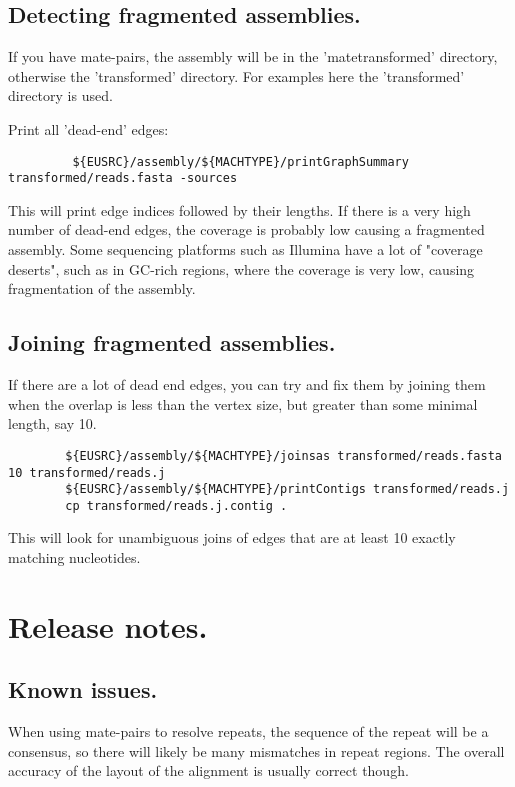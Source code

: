 \documentclass{article}[12pt]
\begin{document}
   \subsection{Detecting fragmented assemblies.}

		If you have mate-pairs, the assembly will be in the
		'matetransformed' directory, otherwise the 'transformed'
		directory.  For examples here the 'transformed' directory is used.
		
		Print all 'dead-end' edges:
\begin{verbatim}
		 ${EUSRC}/assembly/${MACHTYPE}/printGraphSummary transformed/reads.fasta -sources
\end{verbatim}

		This will print edge indices followed by their lengths. If there
		is a very high number of dead-end edges, the coverage is probably
		low causing a fragmented assembly.  Some sequencing platforms such
		as Illumina have a lot of "coverage deserts", such as in GC-rich
		regions, where the coverage is very low, causing fragmentation of
		the assembly.


   \subsection{ Joining fragmented assemblies.}

		If there are a lot of dead end edges, you can try and fix them by
		joining them when the overlap is less than the vertex size, but
		greater than some minimal length, say 10.

\begin{verbatim}
		${EUSRC}/assembly/${MACHTYPE}/joinsas transformed/reads.fasta 10 transformed/reads.j
		${EUSRC}/assembly/${MACHTYPE}/printContigs transformed/reads.j
		cp transformed/reads.j.contig .
\end{verbatim}


		This will look for unambiguous joins of edges that are at least 10
		exactly matching nucleotides.


\section{ Release notes.}
 \subsection{ Known issues.}
	   When using mate-pairs to resolve repeats, the sequence of the
  repeat will be a consensus, so there will likely be many mismatches
  in repeat regions.  The overall accuracy of the layout of the
  alignment is usually correct though.
\end{document}
